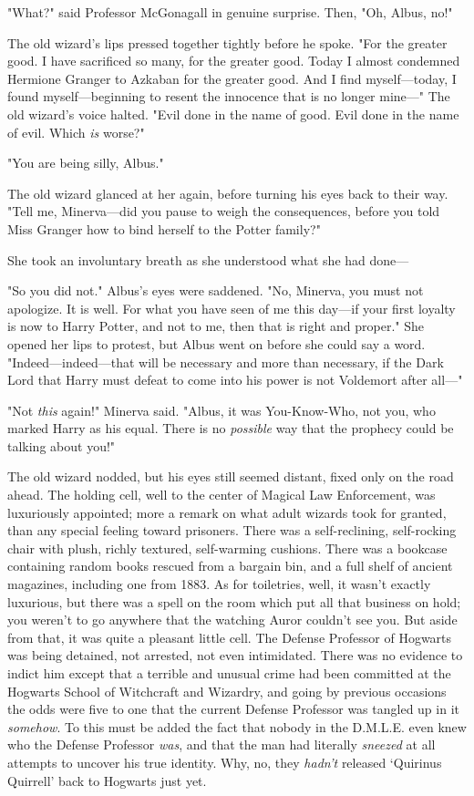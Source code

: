 "What?" said Professor McGonagall in genuine surprise. Then, "Oh, Albus, no!"

The old wizard's lips pressed together tightly before he spoke. "For the
greater good. I have sacrificed so many, for the greater good. Today I almost
condemned Hermione Granger to Azkaban for the greater good. And I find
myself---today, I found myself---beginning to resent the innocence that is no
longer mine\mbox{---}" The old wizard's voice halted. "Evil done in the name of good.
Evil done in the name of evil. Which \emph{is} worse?"

"You are being silly, Albus."

The old wizard glanced at her again, before turning his eyes back to their way.
"Tell me, Minerva---did you pause to weigh the consequences, before you told
Miss Granger how to bind herself to the Potter family?"

She took an involuntary breath as she understood what she had done---

"So you did not." Albus's eyes were saddened. "No, Minerva, you must not
apologize. It is well. For what you have seen of me this day---if your first
loyalty is now to Harry Potter, and not to me, then that is right and proper."
She opened her lips to protest, but Albus went on before she could say a word.
"Indeed---indeed---that will be necessary and more than necessary, if the Dark
Lord that Harry must defeat to come into his power is not Voldemort after
all\mbox{---}"

"Not \emph{this} again!" Minerva said. "Albus, it was You-Know-Who, not you,
who marked Harry as his equal. There is no \emph{possible} way that the
prophecy could be talking about you!"

The old wizard nodded, but his eyes still seemed distant, fixed only on the
road ahead.
\sbreak
The holding cell, well to the center of Magical Law Enforcement, was
luxuriously appointed; more a remark on what adult wizards took for granted,
than any special feeling toward prisoners. There was a self-reclining,
self-rocking chair with plush, richly textured, self-warming cushions. There
was a bookcase containing random books rescued from a bargain bin, and a full
shelf of ancient magazines, including one from 1883. As for toiletries, well,
it wasn't exactly luxurious, but there was a spell on the room which put all
that business on hold; you weren't to go anywhere that the watching Auror
couldn't see you. But aside from that, it was quite a pleasant little cell. The
Defense Professor of Hogwarts was being detained, not arrested, not even
intimidated. There was no evidence to indict him{\el} except that a terrible
and unusual crime had been committed at the Hogwarts School of Witchcraft and
Wizardry, and going by previous occasions the odds were five to one that the
current Defense Professor was tangled up in it \emph{somehow}. To this must be
added the fact that nobody in the D.M.L.E. even knew who the Defense Professor
\emph{was}, and that the man had literally \emph{sneezed} at all attempts to
uncover his true identity. Why, no, they \emph{hadn't} released `Quirinus
Quirrell' back to Hogwarts just yet.

